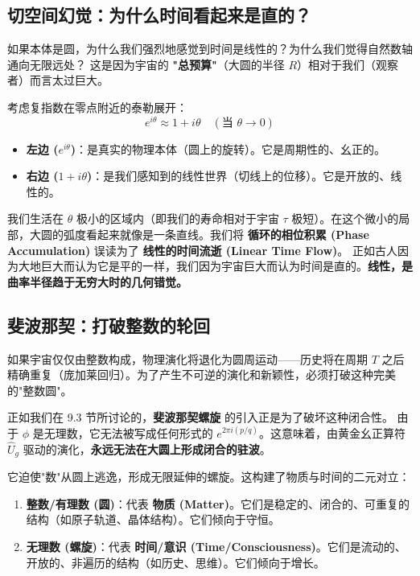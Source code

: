 \subsection{切空间幻觉：为什么时间看起来是直的？}

如果本体是圆，为什么我们强烈地感觉到时间是线性的？为什么我们觉得自然数轴通向无限远处？
这是因为宇宙的 \textbf{"总预算"}（大圆的半径 $R$）相对于我们（观察者）而言太过巨大。

考虑复指数在零点附近的泰勒展开：
\[e^{i \theta} \approx 1 + i\theta \quad (\text{当 } \theta \to 0)\]

\begin{itemize}
\item \textbf{左边 ($e^{i\theta}$)}：是真实的物理本体（圆上的旋转）。它是周期性的、幺正的。
\item \textbf{右边 ($1+i\theta$)}：是我们感知到的线性世界（切线上的位移）。它是开放的、线性的。
\end{itemize}

我们生活在 $\theta$ 极小的区域内（即我们的寿命相对于宇宙 $\tau$ 极短）。在这个微小的局部，大圆的弧度看起来就像是一条直线。我们将 \textbf{循环的相位积累 (Phase Accumulation)} 误读为了 \textbf{线性的时间流逝 (Linear Time Flow)}。
正如古人因为大地巨大而认为它是平的一样，我们因为宇宙巨大而认为时间是直的。\textbf{线性，是曲率半径趋于无穷大时的几何错觉。}

\subsection{斐波那契：打破整数的轮回}

如果宇宙仅仅由整数构成，物理演化将退化为圆周运动——历史将在周期 $T$ 之后精确重复（庞加莱回归）。为了产生不可逆的演化和新颖性，必须打破这种完美的"整数圆"。

正如我们在 9.3 节所讨论的，\textbf{斐波那契螺旋} 的引入正是为了破坏这种闭合性。
由于 $\phi$ 是无理数，它无法被写成任何形式的 $e^{2\pi i (p/q)}$。这意味着，由黄金幺正算符 $\hat{U}_g$ 驱动的演化，\textbf{永远无法在大圆上形成闭合的驻波}。

它迫使"数"从圆上逃逸，形成无限延伸的螺旋。这构建了物质与时间的二元对立：
\begin{enumerate}
\item  \textbf{整数/有理数 (圆)}：代表 \textbf{物质 (Matter)}。它们是稳定的、闭合的、可重复的结构（如原子轨道、晶体结构）。它们倾向于守恒。
\item  \textbf{无理数 (螺旋)}：代表 \textbf{时间/意识 (Time/Consciousness)}。它们是流动的、开放的、非遍历的结构（如历史、思维）。它们倾向于增长。
\end{enumerate}


